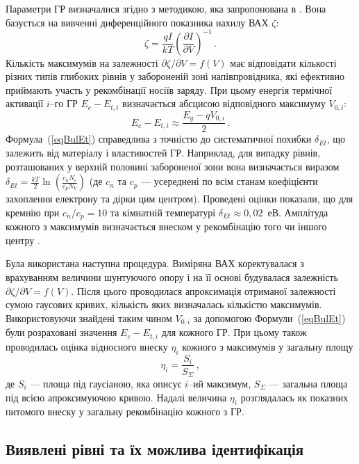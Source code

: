 Параметри ГР визначалися згідно з методикою, яка запропонована в \cite{Bulyar}.
Вона базується на вивченні диференційного показника нахилу ВАХ $\zeta$:
\begin{equation}\label{BetaVAX}
  \zeta=\frac{qI}{kT}\left(\frac{\partial I}{\partial V}\right)^{-1}\,.
\end{equation}
Кількість максимумів на залежності $\partial \zeta/ \partial V = f (V)$ має відповідати кількості різних типів глибоких
рівнів у забороненій зоні напівпровідника,
які ефективно приймають участь у рекомбінації носіїв заряду.
При цьому енергія термічної активації $i$--го ГР $E_c-E_{t,i}$ визначається абсцисою
відповідного максимуму $V_{0,i}$:
\begin{equation}\label{eqBulEt}
  E_c-E_{t,i}\approx \frac{E_g-q V_{0,i}}{2}\,.
\end{equation}
Формула~(\ref{eqBulEt}) справедлива з точністю до систематичної похибки $\delta_{Et}$,
що залежить від матеріалу і властивостей ГР.
Наприклад, для випадку рівнів, розташованих у верхній половині забороненої зони вона визначається виразом
$\delta_{Et}=\frac{kT}{2}\ln\left(\frac{c_n N_c}{c_p N_V}\right)$
(де $c_n$ та $c_p$ --- усереднені по всім станам коефіцієнти захоплення електрону та дірки цим центром).
Проведені оцінки показали, що для кремнію при $c_n/c_p=10$ та кімнатній температурі $\delta_{Et}\approx0,02$~еВ.
Амплітуда кожного з максимумів визначається внеском у рекомбінацію того чи іншого центру \cite{Bulyar}.

Була використана наступна процедура.
Виміряна ВАХ коректувалася з врахуванням величини шунтуючого опору і на її основі будувалася залежність $\partial \zeta/ \partial V = f (V)$.
Після цього проводилася апроксимація отриманої залежності сумою гаусових кривих,
кількість яких визначалась кількістю максимумів.
Використовуючи знайдені таким чином $V_{0,i}$ за допомогою Формули~(\ref{eqBulEt}) були розраховані
значення $E_c-E_{t,i}$ для кожного ГР.
При цьому також проводилась оцінка відносного внеску $\eta_i$ кожного з максимумів у загальну площу
\begin{equation}\label{eqBulEta}
  \eta_i=\frac{S_i}{S_\Sigma}\,,
\end{equation}
де
$S_i$ --- площа під гаусіаною, яка описує $i$--ий максимум,
$S_\Sigma$ --- загальна площа під всією апроксимуючою кривою.
Надалі величина $\eta_i$ розглядалась як показних питомого внеску у загальну рекомбінацію
кожного з ГР.

\subsection{Виявлені рівні та їх можлива ідентифікація}


